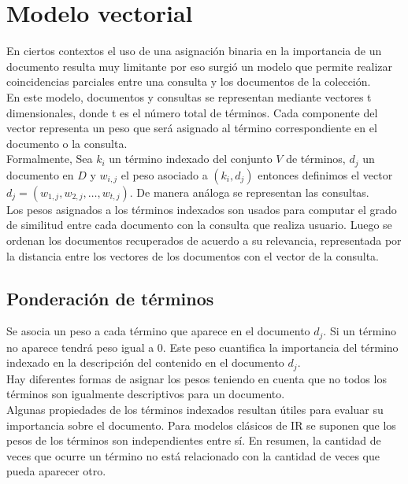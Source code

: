 \section{Modelo vectorial}

En ciertos contextos el uso de una asignación binaria en la importancia de un documento resulta muy limitante por eso surgió un modelo que permite realizar coincidencias parciales entre una consulta y los documentos de la colección. \\

En este modelo, documentos y consultas se representan mediante vectores t dimensionales, donde t es el número total de términos. Cada componente del vector representa un peso que será asignado al término correspondiente en el documento o la consulta. \\

Formalmente, Sea $k_{i}$ un término indexado del conjunto $V$ de términos, $d_{j}$ un documento en $D$ y $w_{i,j}$  el peso asociado a $(k_{i},d_{j})$ entonces definimos el vector $d_{j}= (w_{1,j}, w_{2,j}, … , w_{t,j})$. De manera análoga se representan las consultas. \\  

Los pesos  asignados a los términos indexados son usados para computar el grado de similitud entre cada documento con la consulta que realiza usuario. Luego se ordenan los documentos recuperados de acuerdo a su relevancia, representada por la distancia entre los vectores de los documentos con el vector de la consulta.\\
\subsection{Ponderación de términos} 

Se asocia un peso a cada término que aparece en el documento $d_{j}$. Si un término no aparece tendrá peso igual a 0. Este peso cuantifica la importancia del término indexado en la descripción del contenido en el documento $d_{j}$.\\

Hay diferentes formas de asignar los pesos teniendo en cuenta que no todos los términos son igualmente descriptivos para un documento.\\

Algunas propiedades de los términos indexados resultan útiles para evaluar su importancia sobre el documento. Para modelos clásicos de IR se suponen que los pesos de los términos son independientes entre sí. En resumen, la cantidad de veces que ocurre un término no está relacionado con la cantidad de veces que pueda aparecer otro.\\

